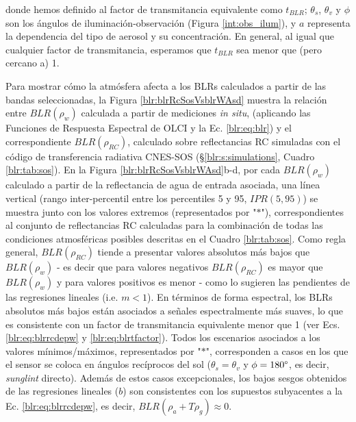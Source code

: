         \noindent donde hemos definido al factor de transmitancia equivalente como $t_{BLR}$; $\theta_{s}$, $\theta_{v}$ y $\phi$ son los ángulos de iluminación-observación (Figura \ref{int:obs_ilum}), y $a$ representa la dependencia del tipo de aerosol y su concentración. En general, al igual que cualquier factor de transmitancia, esperamos que $t_{BLR}$ sea menor que (pero cercano a) 1.
        
        Para mostrar cómo la atmósfera afecta a los BLRs calculados a partir de las bandas seleccionadas, la Figura \ref{blr:blrRcSosVsblrWAsd} muestra la relación entre $BLR(\rho_{w})$ calculada a partir de mediciones \textit{in situ}, (aplicando las Funciones de Respuesta Espectral de OLCI \cite{esasrf} y la Ec. \ref{blr:eq:blr}) y el correspondiente $BLR(\rho_{RC})$, calculado sobre reflectancias RC simuladas con el código de transferencia radiativa CNES-SOS (\S \ref{blr:s:simulations}, Cuadro \ref{blr:tab:sos}). En la Figura \ref{blr:blrRcSosVsblrWAsd}b-d, por cada $BLR(\rho_{w})$ calculado a partir de la reflectancia de agua de entrada asociada, una línea vertical (rango inter-percentil entre los percentiles 5 y 95, $IPR(5,95)$) se muestra junto con los valores extremos (representados por "$*$"), correspondientes al conjunto de reflectancias RC calculadas para la combinación de todas las condiciones atmosféricas posibles descritas en el Cuadro \ref{blr:tab:sos}. Como regla general, $BLR(\rho_{RC})$ tiende a presentar valores absolutos más bajos que $BLR(\rho_{w})$ - es decir que para valores negativos $BLR(\rho_{RC})$ es mayor que $BLR(\rho_{w})$ y para valores positivos es menor - como lo sugieren las pendientes de las regresiones lineales (i.e. $m<1$). En términos de forma espectral, los BLRs absolutos más bajos están asociados a señales espectralmente más suaves, lo que es consistente con un factor de transmitancia equivalente menor que 1 (ver Ecs. \ref{blr:eq:blrrcdepw} y \ref{blr:eq:blrtfactor}). Todos los escenarios asociados a los valores mínimos/máximos, representados por "$*$", corresponden a casos en los que el sensor se coloca en ángulos recíprocos del sol ($\theta_{s}=\theta_{v}$ y $\phi=180\degree$, es decir, \textit{sunglint} directo). Además de estos casos excepcionales, los bajos sesgos obtenidos de las regresiones lineales ($b$) son consistentes con los supuestos subyacentes a la Ec. \ref{blr:eq:blrrcdepw}, es decir, $BLR(\rho_{a}+T\rho_{g})\approx0$.
        

